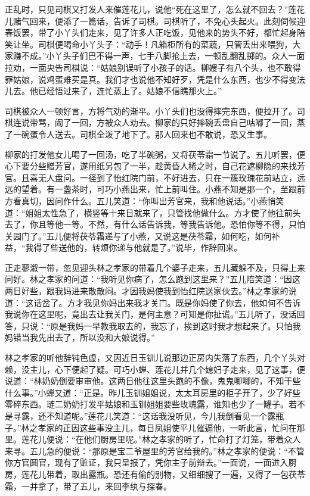 正乱时，只见司棋又打发人来催莲花儿，说他``死在这里了，怎么就不回去？''莲花儿赌气回来，便添了一篇话，告诉了司棋。司棋听了，不免心头起火。此刻伺候迎春饭罢，带了小丫头们走来，见了许多人正吃饭，见他来的势头不好，都忙起身陪笑让坐。司棋便喝命小丫头子：``动手！凡箱柜所有的菜蔬，只管丢出来喂狗，大家赚不成。''小丫头子们巴不得一声，七手八脚抢上去，一顿乱翻乱掷的。众人一面拉劝，一面央告司棋说：``姑娘别误听了小孩子的话。柳嫂子有八个头，也不敢得罪姑娘，说鸡蛋难买是真。我们才也说他不知好歹，凭是什么东西，也少不得变法儿去。他已经悟过来了，连忙蒸上了。姑娘不信瞧那火上。''

司棋被众人一顿好言，方将气劝的渐平。小丫头们也没得摔完东西，便拉开了。司棋连说带骂，闹了一回，方被众人劝去。柳家的只好摔碗丢盘自己咕嘟了一回，蒸了一碗蛋令人送去。司棋全泼了地下了。那人回来也不敢说，恐又生事。

柳家的打发他女儿喝了一回汤，吃了半碗粥，又将茯苓霜一节说了。五儿听罢，便心下要分些赠芳官，遂用纸另包了一半，趁黄昏人稀之时，自己花遮柳隐的来找芳官。且喜无人盘问。一径到了怡红院门前，不好进去，只在一簇玫瑰花前站立，远远的望着。有一盏茶时，可巧小燕出来，忙上前叫住。小燕不知是那一个，至跟前方看真切，因问作什么。五儿笑道：``你叫出芳官来，我和他说话。''小燕悄笑道：``姐姐太性急了，横竖等十来日就来了，只管找他做什么。方才使了他往前头去了，你且等他一等。不然，有什么话告诉我，等我告诉他。恐怕你等不得，只怕关园门了。''五儿便将茯苓霜递与了小燕，又说这是茯苓霜，如何吃，如何补益，``我得了些送他的，转烦你递与他就是了。''说毕，作辞回来。

正走蓼溆一带，忽见迎头林之孝家的带着几个婆子走来，五儿藏躲不及，只得上来问好。林之孝家的问道：``我听见你病了，怎么跑到这里来？''五儿陪笑道：``因这两日好些，跟我妈进来散散闷。才因我妈使我到怡红院送家伙去。''林之孝家的说道：``这话岔了。方才我见你妈出来我才关门。既是你妈使了你去，他如何不告诉我说你在这里呢，竟出去让我关门，是何主意？可知是你扯谎。''五儿听了，没话回答，只说：``原是我妈一早教我取去的，我忘了，挨到这时我才想起来了。只怕我妈错当我先出去了，所以没和大娘说得。''

林之孝家的听他辞钝色虚，又因近日玉钏儿说那边正房内失落了东西，几个丫头对赖，没主儿，心下便起了疑。可巧小蝉、莲花儿并几个媳妇子走来，见了这事，便说道：``林奶奶倒要审审他。这两日他往这里头跑的不像，鬼鬼唧唧的，不知干些什么事。''小蝉又道：``正是。昨儿玉钏姐姐说，太太耳房里的柜子开了，少了好些零碎东西。琏二奶奶打发平姑娘和玉钏姐姐要些玫瑰露，谁知也少了一罐子。若不是寻露，还不知道呢。''莲花儿笑道：``这话我没听见，今儿我倒看见一个露瓶子。''林之孝家的正因这些事没主儿，每日凤姐使平儿催逼他，一听此言，忙问在那里。莲花儿便说：``在他们厨房里呢。''林之孝家的听了，忙命打了灯笼，带着众人来寻。五儿急的便说：``那原是宝二爷屋里的芳官给我的。''林之孝家的便说：``不管你方官圆官，现有了赃证，我只呈报了，凭你主子前辩去。''一面说，一面进入厨房，莲花儿带着，取出露瓶。恐还有偷的别物，又细细搜了一遍，又得了一包茯苓霜，一并拿了，带了五儿，来回李纨与探春。

